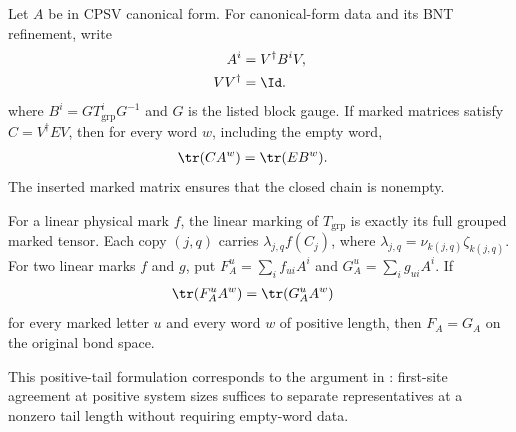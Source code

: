 \begin{lemma}
    \label{thm:cpsv_original_coordinate_marked_lemma_l}
    \leanok
    Let $A$ be in CPSV canonical form. For canonical-form data and
    its BNT refinement, write
    \begin{align}
        A^i        & =V^\dagger B^iV,
        \notag                        \\
        VV^\dagger & =\Id.
        \label{eq:cpsv_original_coisometry_reconstruction}
    \end{align}
    where $B^i=GT_{\mathrm{grp}}^iG^{-1}$ and $G$ is the listed block gauge.
    If marked matrices satisfy $C=V^\dagger EV$, then for every
    word $w$, including the empty word,
    \begin{align}
        \tr(CA^w) & =\tr(EB^w).
        \label{eq:cpsv_original_marked_trace}
    \end{align}
    The inserted marked matrix ensures that the closed chain is nonempty.

    For a linear physical mark $f$, the linear marking of
    $T_{\mathrm{grp}}$ is exactly its full grouped marked tensor. Each
    copy $(j,q)$ carries
    $\lambda_{j,q}f(C_j)$, where
    $\lambda_{j,q}=\nu_{k(j,q)}\zeta_{k(j,q)}$. For two linear marks $f$ and $g$, put
    $F_A^u=\sum_i f_{ui}A^i$ and $G_A^u=\sum_i g_{ui}A^i$. If
    \begin{align}
        \tr\!\left(F_A^uA^w\right)
         & =\tr\!\left(G_A^uA^w\right)
        \label{eq:cpsv_original_linear_marked_agreement}
    \end{align}
    for every marked letter $u$ and every word $w$ of positive length, then
    $F_A=G_A$ on the original bond space.

    This positive-tail formulation corresponds to the argument in
    \cite[Appendix~C.3, lines~1835--1858]{Cirac2016MPDO_arXiv}: first-site agreement
    at positive system sizes suffices to separate representatives at a nonzero tail
    length without requiring empty-word data.
\end{lemma}


